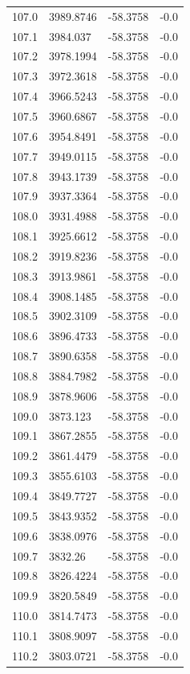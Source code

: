 \begin{table}[H]
\begin{tabular}{llll}
107.0 & 3989.8746 & -58.3758 & -0.0 \\
107.1 & 3984.037 & -58.3758 & -0.0 \\
107.2 & 3978.1994 & -58.3758 & -0.0 \\
107.3 & 3972.3618 & -58.3758 & -0.0 \\
107.4 & 3966.5243 & -58.3758 & -0.0 \\
107.5 & 3960.6867 & -58.3758 & -0.0 \\
107.6 & 3954.8491 & -58.3758 & -0.0 \\
107.7 & 3949.0115 & -58.3758 & -0.0 \\
107.8 & 3943.1739 & -58.3758 & -0.0 \\
107.9 & 3937.3364 & -58.3758 & -0.0 \\
108.0 & 3931.4988 & -58.3758 & -0.0 \\
108.1 & 3925.6612 & -58.3758 & -0.0 \\
108.2 & 3919.8236 & -58.3758 & -0.0 \\
108.3 & 3913.9861 & -58.3758 & -0.0 \\
108.4 & 3908.1485 & -58.3758 & -0.0 \\
108.5 & 3902.3109 & -58.3758 & -0.0 \\
108.6 & 3896.4733 & -58.3758 & -0.0 \\
108.7 & 3890.6358 & -58.3758 & -0.0 \\
108.8 & 3884.7982 & -58.3758 & -0.0 \\
108.9 & 3878.9606 & -58.3758 & -0.0 \\
109.0 & 3873.123 & -58.3758 & -0.0 \\
109.1 & 3867.2855 & -58.3758 & -0.0 \\
109.2 & 3861.4479 & -58.3758 & -0.0 \\
109.3 & 3855.6103 & -58.3758 & -0.0 \\
109.4 & 3849.7727 & -58.3758 & -0.0 \\
109.5 & 3843.9352 & -58.3758 & -0.0 \\
109.6 & 3838.0976 & -58.3758 & -0.0 \\
109.7 & 3832.26 & -58.3758 & -0.0 \\
109.8 & 3826.4224 & -58.3758 & -0.0 \\
109.9 & 3820.5849 & -58.3758 & -0.0 \\
110.0 & 3814.7473 & -58.3758 & -0.0 \\
110.1 & 3808.9097 & -58.3758 & -0.0 \\
110.2 & 3803.0721 & -58.3758 & -0.0 \\

\end{tabular}
\end{table}
